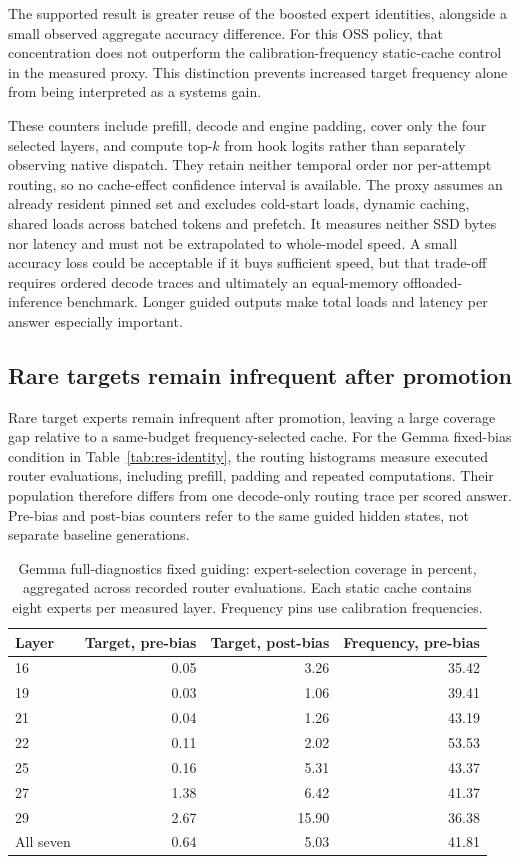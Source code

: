 \documentclass[12pt,a4paper,twoside,openright]{book}
\begin{document}
The supported result is greater reuse of the boosted expert identities,
alongside a small observed aggregate accuracy difference. For this OSS
policy, that concentration does not outperform the calibration-frequency
static-cache control in the measured proxy. This distinction prevents
increased target frequency alone from being interpreted as a systems gain.

These counters include prefill, decode and engine padding, cover only the
four selected layers, and compute top-$k$ from hook logits rather than
separately observing native dispatch. They retain neither temporal order
nor per-attempt routing, so no cache-effect confidence interval is available.
The proxy assumes an already resident pinned set and excludes cold-start
loads, dynamic caching, shared loads across batched tokens and prefetch.
It measures neither SSD bytes nor latency and must not be extrapolated to
whole-model speed. A small accuracy loss could be acceptable if it buys
sufficient speed, but that trade-off requires ordered decode traces and
ultimately an equal-memory offloaded-inference benchmark. Longer guided
outputs make total loads and latency per answer especially important.

\subsection{Rare targets remain infrequent after promotion}
\label{sec:gemma-cache-diagnostics}

Rare target experts remain infrequent after promotion, leaving a large
coverage gap relative to a same-budget frequency-selected cache. For the Gemma
fixed-bias condition in Table~\ref{tab:res-identity}, the routing histograms
measure executed router evaluations, including prefill, padding and repeated
computations. Their population therefore differs from one decode-only routing
trace per scored answer. Pre-bias and post-bias counters refer to the same
guided hidden states, not separate baseline generations.

\begin{table}[ht]
\centering\small
\caption{Gemma full-diagnostics fixed guiding: expert-selection coverage
in percent, aggregated across recorded router evaluations. Each static cache
contains eight experts per measured layer. Frequency pins use calibration
frequencies.}
\label{tab:gemma-cache-coverage}
\begin{tabular}{lrrr}
\toprule
Layer & Target, pre-bias & Target, post-bias & Frequency, pre-bias \\
\midrule
16 & 0.05 & 3.26 & 35.42 \\
19 & 0.03 & 1.06 & 39.41 \\
21 & 0.04 & 1.26 & 43.19 \\
22 & 0.11 & 2.02 & 53.53 \\
25 & 0.16 & 5.31 & 43.37 \\
27 & 1.38 & 6.42 & 41.37 \\
29 & 2.67 & 15.90 & 36.38 \\
All seven & 0.64 & 5.03 & 41.81 \\
\bottomrule
\end{tabular}
\end{table}
\end{document}
